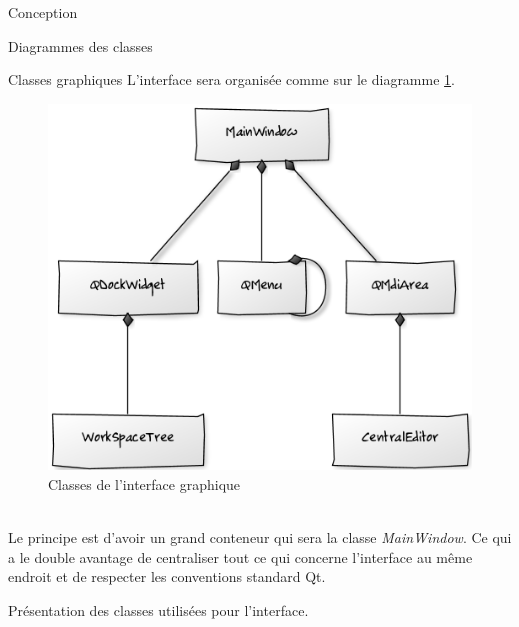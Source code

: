 \documentclass[a4paper, 12pt]{report}
\begin{document}
\begin{part}{Conception}
\begin{chapter}{Diagrammes des classes}
\begin{section}{Classes graphiques}
				L'interface sera organisée comme sur le diagramme \ref{chauffage}.

				\begin{figure}[ht]
					\begin{center}
						\includegraphics[width=12cm]{images/classesGraphiques.png}
						\caption{Classes de l'interface graphique}
						\label{chauffage}
					\end{center}
				\end{figure}~\\

				Le principe est d'avoir un grand conteneur qui sera la classe \emph{MainWindow}. Ce qui a le double avantage de centraliser
				tout ce qui concerne l'interface au même endroit et de respecter les conventions standard \gls{Qt}.



			Présentation des classes utilisées pour l’interface.


\end{section}
\end{chapter}
\end{part}
\end{document}
